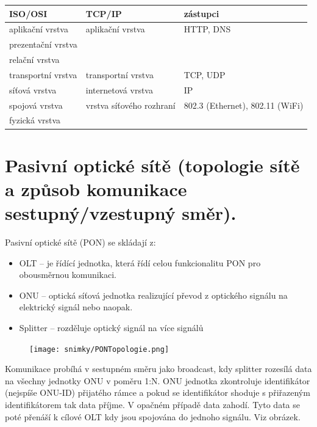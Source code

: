 \begin{table}[ht]
    \centering
    \begin{tabular}{lll}
        \textbf{ISO/OSI}   & \textbf{TCP/IP}          & zástupci                        \\
        \hline \hline
        aplikační vrstva   & aplikační vrstva         & HTTP, DNS                       \\
        prezentační vrstva &                          &                                 \\
        relační vrstva     &                          &                                 \\
        \hline
        transportní vrstva & transportní vrstva       & TCP, UDP                        \\
        \hline
        síťová vrstva      & internetová vrstva       & IP                              \\
        \hline
        spojová vrstva     & vrstva síťového rozhraní & 802.3 (Ethernet), 802.11 (WiFi) \\
        fyzická vrstva     &                          &                                 \\
    \end{tabular}
    \label{Srovnání modelů ISO/OSI a TCP/IP}
\end{table}


\clearpage
\section{Pasivní optické sítě (topologie sítě a způsob komunikace sestupný/vzestupný směr).}
Pasivní optické sítě (PON) se skládají z:
\begin{itemize}
    \item OLT -- je řídící jednotka, která řídí celou funkcionalitu PON pro obousměrnou komunikaci.
    \item ONU -- optická síťová jednotka realizující převod z optického signálu na elektrický signál nebo naopak.
    \item Splitter -- rozděluje optický signál na více signálů
\end{itemize}
\begin{figure} [h]
    \centering
    \texttt{[image: snimky/PONTopologie.png]}
    \label{fig:pon}
\end{figure}

Komunikace probíhá v sestupném směru jako broadcast, kdy splitter rozesílá data na všechny jednotky ONU v poměru 1:N. ONU jednotka zkontroluje identifikátor (nejspíše ONU-ID) přijatého rámce a pokud se identifikátor shoduje s přiřazeným identifikátorem tak data příjme. V opačném případě data zahodí. Tyto data se poté přenáší k cílové OLT kdy jsou spojována do jednoho signálu. Viz obrázek.

